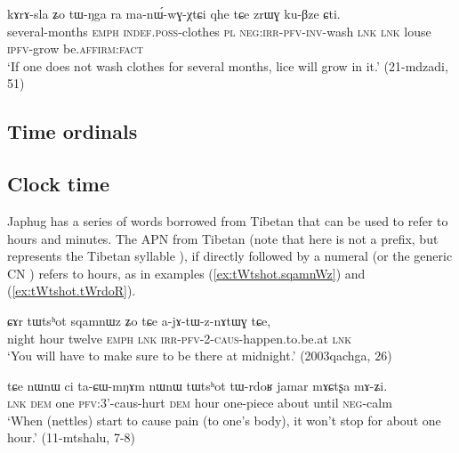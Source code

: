 {\begin{exe}
\ex \label{ex:kArAsla}
\gll
kɤrɤ-sla ʑo tɯ-ŋga ra ma-nɯ́-wɣ-χtɕi qhe tɕe zrɯɣ ku-βze ɕti.  \\
several-months \textsc{emph} \textsc{indef}.\textsc{poss}-clothes \textsc{pl} \textsc{neg}:\textsc{irr}-\textsc{pfv}-\textsc{inv}-wash \textsc{lnk} \textsc{lnk} louse \textsc{ipfv}-grow be.\textsc{affirm}:\textsc{fact} \\
\glt `If one does not wash clothes for several months, lice will grow in it.' (21-mdzadi, 51)
\end{exe}


 


\subsection{Time ordinals} \label{sec:time.ordinals}
 

 \subsection{Clock time} \label{sec:hours}
Japhug has a series of words borrowed from Tibetan that can be used to refer to hours and minutes.  The APN  from Tibetan  (note that  here is not a prefix, but represents the Tibetan syllable  ), if directly followed by a numeral (or the generic CN ) refers to hours, as in examples (\ref{ex:tWtshot.sqamnWz}) and (\ref{ex:tWtshot.tWrdoR}).

\begin{exe}
\ex \label{ex:tWtshot.sqamnWz}
 \gll ɕɤr tɯtsʰot sqamnɯz ʑo tɕe a-jɤ-tɯ-z-nɤtɯɣ tɕe, \\
 night hour twelve \textsc{emph} \textsc{lnk}  \textsc{irr}-\textsc{pfv}-2-\textsc{caus}-happen.to.be.at \textsc{lnk} \\
 \glt `You will have to make sure to be there at midnight.' (2003qachga, 26)
 \end{exe}
 
 \begin{exe}
\ex \label{ex:tWtshot.tWrdoR}
 \gll  tɕe nɯnɯ ci ta-ɕɯ-mŋɤm nɯnɯ tɯtsʰot tɯ-rdoʁ jamar mɤɕtʂa mɤ-ʑi. \\
 \textsc{lnk} \textsc{dem} one \textsc{pfv}:3'-caus-hurt \textsc{dem} hour one-piece about until \textsc{neg}-calm \\
 \glt `When (nettles) start to cause pain (to one's body), it won't stop for about one hour.' (11-mtshalu, 7-8)
  \end{exe}

}
